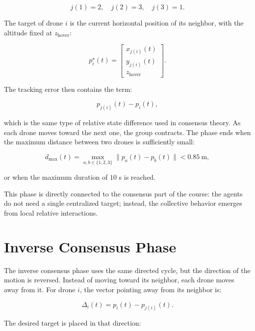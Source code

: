 \begin{equation}
    j(1)=2, \quad j(2)=3, \quad j(3)=1.
\end{equation}

The target of drone $i$ is the current horizontal position of its neighbor, with the altitude fixed at $z_{\text{hover}}$:

\begin{equation}
    p_i^{\star}(t)=
    \begin{bmatrix}
    x_{j(i)}(t) \\
    y_{j(i)}(t) \\
    z_{\text{hover}}
    \end{bmatrix}.
\end{equation}

The tracking error then contains the term:

\begin{equation}
    p_{j(i)}(t)-p_i(t),
\end{equation}

which is the same type of relative state difference used in consensus theory. As each drone moves toward the next one, the group contracts. The phase ends when the maximum distance between two drones is sufficiently small:

\begin{equation}
    d_{\max}(t)=\max_{a,b\in\{1,2,3\}}\|p_a(t)-p_b(t)\|<0.85 \ \text{m},
\end{equation}

or when the maximum duration of $10$ s is reached.

This phase is directly connected to the consensus part of the course: the agents do not need a single centralized target; instead, the collective behavior emerges from local relative interactions.

\section{Inverse Consensus Phase}

The inverse consensus phase uses the same directed cycle, but the direction of the motion is reversed. Instead of moving toward its neighbor, each drone moves away from it. For drone $i$, the vector pointing away from its neighbor is:

\begin{equation}
    \Delta_i(t)=p_i(t)-p_{j(i)}(t).
\end{equation}

The desired target is placed in that direction:

